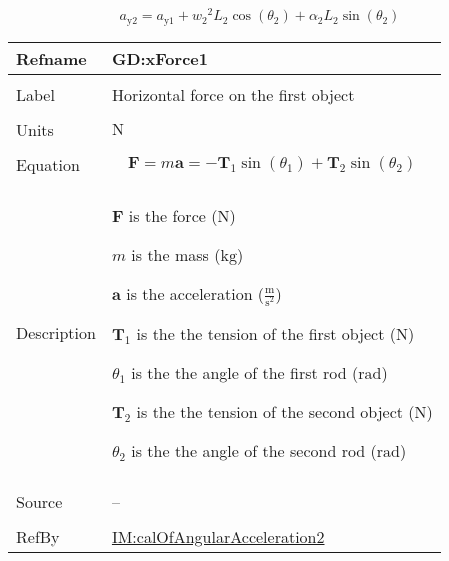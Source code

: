 \documentclass[12pt]{article}
\begin{document}
\begin{displaymath}
{a_{\text{y}2}}={a_{\text{y}1}}+{w_{2}}^{2} {L_{2}} \cos\left({θ_{2}}\right)+{α_{2}} {L_{2}} \sin\left({θ_{2}}\right)
\end{displaymath}
\vspace{\baselineskip}
\noindent
\begin{minipage}{\textwidth}
\begin{tabular}{>{\raggedright}p{}>{\raggedright\arraybackslash}p{}}
\toprule \textbf{Refname} & \textbf{GD:xForce1}
\label{GD:xForce1}
\\ \midrule \\
Label & Horizontal force on the first object
        
\\ \midrule \\
Units & ${\text{N}}$
        
\\ \midrule \\
Equation & \begin{displaymath}
           \symbf{F}=m \symbf{a}=-{\symbf{T}_{1}} \sin\left({θ_{1}}\right)+{\symbf{T}_{2}} \sin\left({θ_{2}}\right)
           \end{displaymath}
\\ \midrule \\
Description & \begin{symbDescription}
              \item{$\symbf{F}$ is the force (${\text{N}}$)}
              \item{$m$ is the mass (${\text{kg}}$)}
              \item{$\symbf{a}$ is the acceleration ($\frac{\text{m}}{\text{s}^{2}}$)}
              \item{${\symbf{T}_{1}}$ is the the tension of the first object (${\text{N}}$)}
              \item{${θ_{1}}$ is the the angle of the first rod (${\text{rad}}$)}
              \item{${\symbf{T}_{2}}$ is the the tension of the second object (${\text{N}}$)}
              \item{${θ_{2}}$ is the the angle of the second rod (${\text{rad}}$)}
              \end{symbDescription}
\\ \midrule \\
Source & --
         
\\ \midrule \\
RefBy & \hyperref[IM:calOfAngularAcceleration2]{IM:calOfAngularAcceleration2}
        
\\ \bottomrule
\end{tabular}
\end{minipage}
\end{document}
